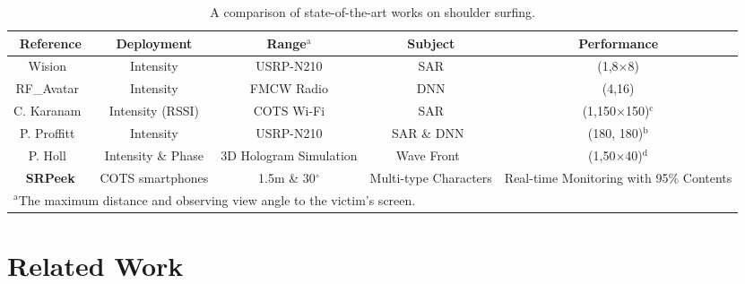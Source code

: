 \begin{table*}[t]
    \caption{A comparison of state-of-the-art works on shoulder surfing.}
    \vspace{2mm}
    \begin{center}
    \begin{tabular}{ccccc}
    \hline
     Reference & Deployment & Range$^{\mathrm{a}}$ & Subject & Performance\\ 
    \hline
    Wision~\cite{wision}  & Intensity & USRP-N210 & SAR & (1,8$\times$8)\\ 
    RF\_Avatar~\cite{rf_avatar}  & Intensity & FMCW Radio & DNN & (4,16)\\ 
    C. Karanam~\cite{3dimaging_uav} & Intensity (RSSI) & COTS Wi-Fi & SAR & (1,150$\times$150)$^{\mathrm{c}}$\\ 
    P. Proffitt~\cite{imaging_1} & Intensity & USRP-N210 & SAR \& DNN~\cite{MaskRCNN} & (180, 180)$^{\mathrm{b}}$\\ 
    P. Holl~\cite{holography} & Intensity \& Phase & 3D Hologram Simulation & Wave Front~\cite{angular} & (1,50$\times$40)$^{\mathrm{d}}$\\ 
    \hline
    \hline
    \textbf{\textsf{SRPeek}} & COTS smartphones & 1.5m \& 30$^\circ$ & Multi-type Characters & Real-time Monitoring with 95\% Contents\\
    \hline
    \multicolumn{5}{l}{$^{\mathrm{a}}$The maximum distance and observing view angle to the victim's screen.}\\
    \end{tabular}
    \label{tbl:comparison}
    \end{center}
\end{table*}

\section{Related Work}
\label{sec-related-work}
